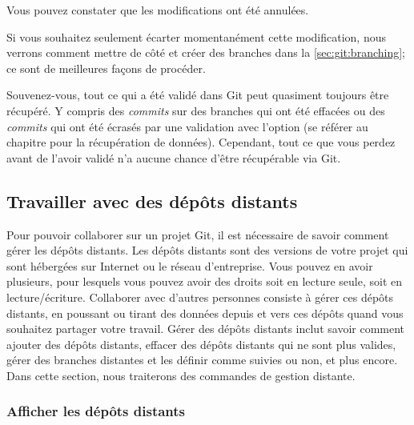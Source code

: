 Vous pouvez constater que les modifications ont été annulées.


Si vous souhaitez seulement écarter momentanément cette modification, nous verrons comment mettre de côté et créer des branches dans la \autoref{sec:git:branching}; ce sont de meilleures façons de procéder.

Souvenez-vous, tout ce qui a été validé dans Git peut quasiment toujours être récupéré.
Y compris des \emph{commits} sur des branches qui ont été effacées ou des \emph{commits} qui ont été écrasés par une validation avec l'option  (se référer au chapitre  pour la récupération de données).
Cependant, tout ce que vous perdez avant de l'avoir validé n'a aucune chance d'être récupérable via Git.

\subsection{Travailler avec des dépôts distants}
\label{sec:git:remote_repos}

Pour pouvoir collaborer sur un projet Git, il est nécessaire de savoir comment gérer les dépôts distants.
Les dépôts distants sont des versions de votre projet qui sont hébergées sur Internet ou le réseau d'entreprise.
Vous pouvez en avoir plusieurs, pour lesquels vous pouvez avoir des droits soit en lecture seule, soit en lecture/écriture.
Collaborer avec d'autres personnes consiste à gérer ces dépôts distants, en poussant ou tirant des données depuis et vers ces dépôts quand vous souhaitez partager votre travail.
Gérer des dépôts distants inclut savoir comment ajouter des dépôts distants, effacer des dépôts distants qui ne sont plus valides, gérer des branches distantes et les définir comme suivies ou non, et plus encore.
Dans cette section, nous traiterons des commandes de gestion distante.

\subsubsection{Afficher les dépôts distants}

